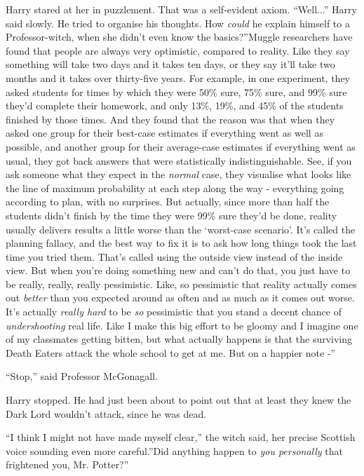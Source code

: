 Harry stared at her in puzzlement. That was a self-evident axiom.
``Well...'' Harry said slowly. He tried to organise his thoughts.
How \emph{could} he explain himself to a Professor-witch, when she
didn't even know the basics?''Muggle researchers have found that people
are always very optimistic, compared to reality. Like they say something
will take two days and it takes ten days, or they say it'll take two
months and it takes over thirty-five years. For example, in one
experiment, they asked students for times by which they were 50\% sure,
75\% sure, and 99\% sure they'd complete their homework, and only 13\%,
19\%, and 45\% of the students finished by those times. And they found
that the reason was that when they asked one group for their best-case
estimates if everything went as well as possible, and another group for
their average-case estimates if everything went as usual, they got back
answers that were statistically indistinguishable. See, if you ask
someone what they expect in the \emph{normal} case, they visualise what
looks like the line of maximum probability at each step along the way -
everything going according to plan, with no surprises. But actually,
since more than half the students didn't finish by the time they were
99\% sure they'd be done, reality usually delivers results a little
worse than the `worst-case scenario'. It's called the planning fallacy,
and the best way to fix it is to ask how long things took the last time
you tried them. That's called using the outside view instead of the
inside view. But when you're doing something new and can't do that, you
just have to be really, really, really pessimistic. Like, so pessimistic
that reality actually comes out \emph{better} than you expected around
as often and as much as it comes out worse. It's actually \emph{really
hard} to be \emph{so} pessimistic that you stand a decent chance of
\emph{undershooting} real life. Like I make this big effort to be gloomy
and I imagine one of my classmates getting bitten, but what actually
happens is that the surviving Death Eaters attack the whole school to
get at me. But on a happier note -''

``Stop,'' said Professor McGonagall.

Harry stopped. He had just been about to point out that at least they
knew the Dark Lord wouldn't attack, since he was dead.

``I think I might not have made myself clear,'' the witch said, her
precise Scottish voice sounding even more careful.''Did anything happen
to \emph{you personally} that frightened you, Mr. Potter?''

